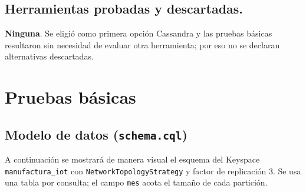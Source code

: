 \documentclass[12pt]{article}
\newcommand{\cmd}[1]{\colorbox{gray!20}{\texttt{#1}}}
\begin{document}
\subsection{Herramientas probadas y descartadas.}
\textbf{Ninguna}. Se eligió como primera opción Cassandra y las
pruebas básicas resultaron sin necesidad de evaluar otra herramienta; por eso no se declaran alternativas
descartadas.
\newpage
\section{Pruebas básicas}
\subsection{Modelo de datos (\texttt{schema.cql})}
A continuación se mostrará de manera visual el esquema del Keyspace \cmd{manufactura\_iot} con \cmd{NetworkTopologyStrategy} y factor de replicación 3.
Se usa una tabla por consulta; el campo \texttt{mes} acota el tamaño de cada partición.
\end{document}
